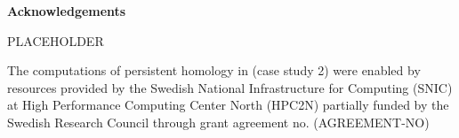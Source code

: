 \newenvironment{acknowledgements}%
    {\cleardoublepage\thispagestyle{empty}\null\vfill\begin{center}%
    \bfseries Acknowledgements\end{center}}%
    {\vfill\null}
        \begin{acknowledgements}
          \begin{center}
            PLACEHOLDER
            \end{center}
            \vspace{6cm}
  The computations of persistent homology in (case study 2) were enabled by resources provided by the Swedish National Infrastructure for Computing (SNIC) at High Performance Computing Center North (HPC2N) partially funded by the Swedish Research Council through grant agreement no. (AGREEMENT-NO)
        \end{acknowledgements}
